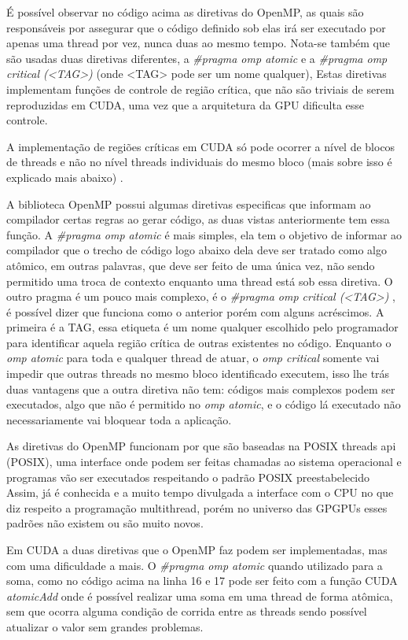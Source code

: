     É possível observar no código acima as diretivas do OpenMP, as quais são responsáveis por assegurar que o código definido sob elas irá ser executado por apenas uma thread por vez, nunca duas ao mesmo tempo. Nota-se também que são usadas duas diretivas diferentes, a \textit{\#pragma omp atomic} e a \textit{\#pragma omp critical (<TAG>) } (onde <TAG> pode ser um nome qualquer), Estas diretivas implementam funções de controle de região crítica, que não são triviais de serem reproduzidas em CUDA, uma vez que a arquitetura da GPU dificulta esse controle.
    
    A implementação de regiões críticas em CUDA só pode ocorrer a nível de blocos de threads e não no nível  threads individuais do mesmo bloco (mais sobre isso é explicado mais abaixo) . 

    A biblioteca OpenMP possui algumas diretivas especificas que informam ao compilador certas regras ao gerar código, as duas vistas anteriormente tem essa função. A \textit{\#pragma omp atomic} é mais simples, ela tem o objetivo de informar ao compilador que o trecho de código logo abaixo dela deve ser tratado como algo atômico, em outras palavras, que deve ser feito de uma única vez, não sendo permitido uma troca de contexto enquanto uma thread está sob essa diretiva. O outro pragma é um pouco mais complexo, é o \textit{\#pragma omp critical (<TAG>) }, é possível  dizer que funciona como o anterior porém com alguns acréscimos. A primeira é a TAG, essa etiqueta é um nome qualquer escolhido pelo programador para identificar aquela região crítica de outras existentes no código. Enquanto o \textit{omp atomic} para toda e qualquer thread de atuar, o \textit{omp critical} somente vai impedir que outras threads no mesmo bloco identificado executem, isso lhe trás duas vantagens que a outra diretiva não tem: códigos mais complexos podem ser executados, algo que não é permitido no \textit{omp atomic}, e o código lá executado não necessariamente vai bloquear toda a aplicação.

    As diretivas do OpenMP funcionam por que são baseadas na POSIX threads api (POSIX), uma interface onde podem ser feitas chamadas ao sistema operacional e programas vão ser executados respeitando o padrão POSIX preestabelecido Assim, já é conhecida e a muito tempo divulgada a interface com o CPU no que diz respeito a programação multithread, porém no universo das GPGPUs esses padrões não existem ou são muito novos.

    Em CUDA a duas diretivas que o OpenMP faz podem ser implementadas, mas com uma dificuldade a mais. O \textit{\#pragma omp atomic} quando utilizado para a soma, como no código acima na linha 16 e 17 pode ser feito com a função CUDA \textit{atomicAdd} onde é possível realizar uma soma em uma thread de forma atômica, sem que ocorra alguma condição de corrida entre as threads sendo possível atualizar o valor sem grandes problemas.

